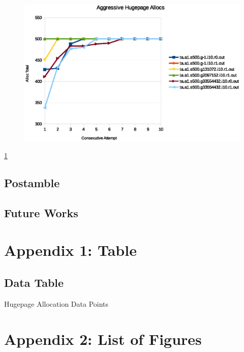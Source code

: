 \documentclass{article}
\begin{document}
\begin{figure}[h!]
	\includegraphics[width=\linewidth]{./datums/aggressive_alloc.eps}
	\label{fig:aggressive_alloc}
\end{figure}
\ref{fig:aggressive_alloc}

\section{Postamble}
\section{Future Works}
\begin{appendices}
	\newpage
	\chapter{Appendix 1: Table}
		\section{Data Table}
		\begin{table}[h!]
			\caption{Hugepage Allocation Data Points}
			\label{table1}
			\end{table}
	\chapter{Appendix 2: List of Figures}
		\listoffigures
\end{appendices}
\end{document}
